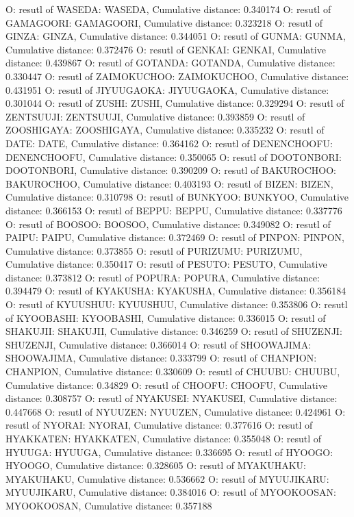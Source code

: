 O: resutl of WASEDA: WASEDA, Cumulative distance: 0.340174
O: resutl of GAMAGOORI: GAMAGOORI, Cumulative distance: 0.323218
O: resutl of GINZA: GINZA, Cumulative distance: 0.344051
O: resutl of GUNMA: GUNMA, Cumulative distance: 0.372476
O: resutl of GENKAI: GENKAI, Cumulative distance: 0.439867
O: resutl of GOTANDA: GOTANDA, Cumulative distance: 0.330447
O: resutl of ZAIMOKUCHOO: ZAIMOKUCHOO, Cumulative distance: 0.431951
O: resutl of JIYUUGAOKA: JIYUUGAOKA, Cumulative distance: 0.301044
O: resutl of ZUSHI: ZUSHI, Cumulative distance: 0.329294
O: resutl of ZENTSUUJI: ZENTSUUJI, Cumulative distance: 0.393859
O: resutl of ZOOSHIGAYA: ZOOSHIGAYA, Cumulative distance: 0.335232
O: resutl of DATE: DATE, Cumulative distance: 0.364162
O: resutl of DENENCHOOFU: DENENCHOOFU, Cumulative distance: 0.350065
O: resutl of DOOTONBORI: DOOTONBORI, Cumulative distance: 0.390209
O: resutl of BAKUROCHOO: BAKUROCHOO, Cumulative distance: 0.403193
O: resutl of BIZEN: BIZEN, Cumulative distance: 0.310798
O: resutl of BUNKYOO: BUNKYOO, Cumulative distance: 0.366153
O: resutl of BEPPU: BEPPU, Cumulative distance: 0.337776
O: resutl of BOOSOO: BOOSOO, Cumulative distance: 0.349082
O: resutl of PAIPU: PAIPU, Cumulative distance: 0.372469
O: resutl of PINPON: PINPON, Cumulative distance: 0.373855
O: resutl of PURIZUMU: PURIZUMU, Cumulative distance: 0.350417
O: resutl of PESUTO: PESUTO, Cumulative distance: 0.373812
O: resutl of POPURA: POPURA, Cumulative distance: 0.394479
O: resutl of KYAKUSHA: KYAKUSHA, Cumulative distance: 0.356184
O: resutl of KYUUSHUU: KYUUSHUU, Cumulative distance: 0.353806
O: resutl of KYOOBASHI: KYOOBASHI, Cumulative distance: 0.336015
O: resutl of SHAKUJII: SHAKUJII, Cumulative distance: 0.346259
O: resutl of SHUZENJI: SHUZENJI, Cumulative distance: 0.366014
O: resutl of SHOOWAJIMA: SHOOWAJIMA, Cumulative distance: 0.333799
O: resutl of CHANPION: CHANPION, Cumulative distance: 0.330609
O: resutl of CHUUBU: CHUUBU, Cumulative distance: 0.34829
O: resutl of CHOOFU: CHOOFU, Cumulative distance: 0.308757
O: resutl of NYAKUSEI: NYAKUSEI, Cumulative distance: 0.447668
O: resutl of NYUUZEN: NYUUZEN, Cumulative distance: 0.424961
O: resutl of NYORAI: NYORAI, Cumulative distance: 0.377616
O: resutl of HYAKKATEN: HYAKKATEN, Cumulative distance: 0.355048
O: resutl of HYUUGA: HYUUGA, Cumulative distance: 0.336695
O: resutl of HYOOGO: HYOOGO, Cumulative distance: 0.328605
O: resutl of MYAKUHAKU: MYAKUHAKU, Cumulative distance: 0.536662
O: resutl of MYUUJIKARU: MYUUJIKARU, Cumulative distance: 0.384016
O: resutl of MYOOKOOSAN: MYOOKOOSAN, Cumulative distance: 0.357188
